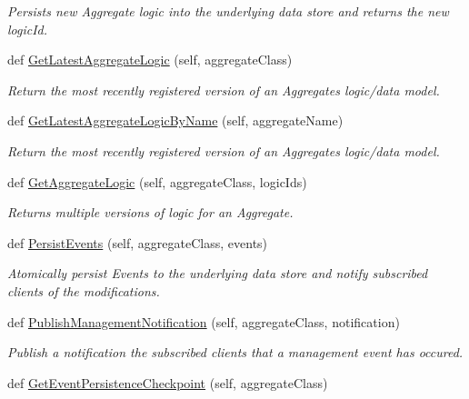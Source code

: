 \begin{DoxyCompactItemize}
\begin{DoxyCompactList}\small\item\em Persists new Aggregate logic into the underlying data store and returns the new logic\+Id. \end{DoxyCompactList}\item 
def \hyperlink{group__Chronos_gaac3c8acece5840e33d6ea383f60c1114}{Get\+Latest\+Aggregate\+Logic} (self, aggregate\+Class)
\begin{DoxyCompactList}\small\item\em Return the most recently registered version of an Aggregate\textquotesingle{}s logic/data model. \end{DoxyCompactList}\item 
def \hyperlink{group__Chronos_gab524764c52a48bd4b924d7518ba35f4c}{Get\+Latest\+Aggregate\+Logic\+By\+Name} (self, aggregate\+Name)
\begin{DoxyCompactList}\small\item\em Return the most recently registered version of an Aggregate\textquotesingle{}s logic/data model. \end{DoxyCompactList}\item 
def \hyperlink{group__Chronos_gae000957aba7b70433c500fd97e0893e8}{Get\+Aggregate\+Logic} (self, aggregate\+Class, logic\+Ids)
\begin{DoxyCompactList}\small\item\em Returns multiple versions of logic for an Aggregate. \end{DoxyCompactList}\item 
def \hyperlink{group__Chronos_gad7ca7261b0789dd61ca81a60ee414f94}{Persist\+Events} (self, aggregate\+Class, events)
\begin{DoxyCompactList}\small\item\em Atomically persist Events to the underlying data store and notify subscribed clients of the modifications. \end{DoxyCompactList}\item 
def \hyperlink{group__Chronos_gaf08457efe1c1b5f45451547f543b2fd6}{Publish\+Management\+Notification} (self, aggregate\+Class, notification)
\begin{DoxyCompactList}\small\item\em Publish a notification the subscribed clients that a management event has occured. \end{DoxyCompactList}\item 
def \hyperlink{group__Chronos_gaaf58520cf6503cad9967af939efca480}{Get\+Event\+Persistence\+Checkpoint} (self, aggregate\+Class)

\end{DoxyCompactItemize}
